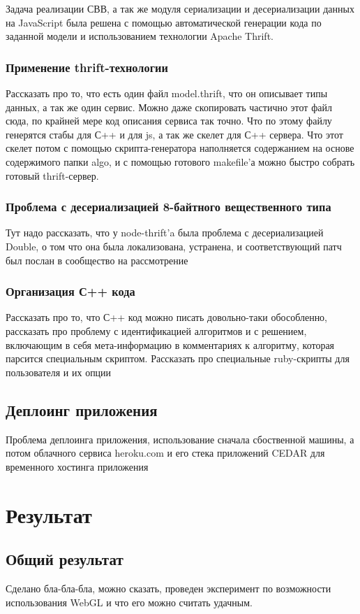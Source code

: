 \documentclass[12pt, a4paper]{article}
\let\stdsection\section
\renewcommand\section{\newpage\stdsection}
\begin{document}
Задача реализации СВВ, а так же модуля сериализации и десериализации данных на
JavaScript была решена с помощью автоматической генерации кода по заданной
модели и использованием технологии Apache Thrift.

\subsubsection{Применение thrift-технологии}
Рассказать про то, что есть один файл model.thrift, что он описывает типы
данных, а так же один сервис. Можно даже скопировать частично этот файл сюда, по
крайней мере код описания сервиса так точно. Что по этому файлу генерятся стабы
для С++ и для js, а так же скелет для С++ сервера. Что этот скелет потом
с помощью скрипта-генератора наполняется содержанием на основе содержимого папки
algo, и с помощью готового makefile'а можно быстро собрать готовый
thrift-сервер.
\subsubsection{Проблема с десериализацией 8-байтного вещественного типа}
Тут надо рассказать, что у node-thrift'a была проблема с десериализацией Double,
о том что она была локализована, устранена, и соответствующий патч был послан в
сообщество на рассмотрение
\subsubsection{Организация С++ кода}
Рассказать про то, что С++ код можно писать довольно-таки обособленно,
рассказать про проблему с идентификацией алгоритмов и с решением, включающим в
себя мета-информацию в комментариях к алгоритму, которая парсится специальным
скриптом. Рассказать про специальные ruby-скрипты для пользователя и их опции

\subsection{Деплоинг приложения}
Проблема деплоинга приложения, использование сначала сбоственной машины, а потом
облачного сервиса heroku.com и его стека приложений CEDAR для временного
хостинга приложения


\section{Результат}
\subsection{Общий результат}
Сделано бла-бла-бла, можно сказать, проведен эксперимент по возможности
использования WebGL и что его можно считать удачным.
\end{document}
